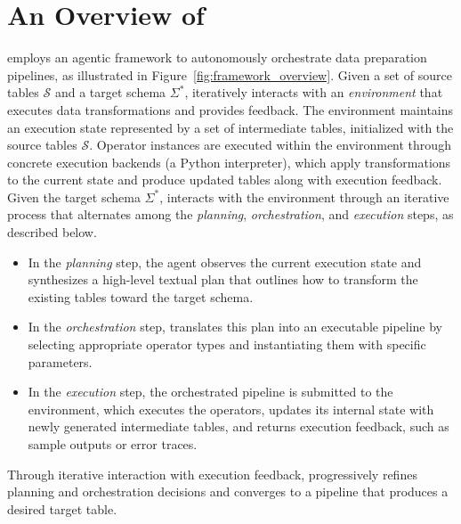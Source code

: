 \section{An Overview of \sys}
\label{sec:overview}


\sys employs an agentic framework to autonomously orchestrate data preparation pipelines, as illustrated in Figure~\ref{fig:framework_overview}. Given a set of source tables $\mathcal{S}$ and a target schema $\Sigma^{\ast}$, \sys iteratively interacts with an \emph{environment} that executes data transformations and provides feedback.
%
The environment maintains an execution state represented by a set of intermediate tables, initialized with the source tables $\mathcal{S}$. Operator instances are executed within the environment through concrete execution backends (\eg a Python interpreter), which apply transformations to the current state and produce updated tables along with execution feedback.
%
Given the target schema $\Sigma^{\ast}$, \sys interacts with the environment through an iterative process that alternates among the \emph{planning}, \emph{orchestration}, and \emph{execution} steps, as described below.
%
\begin{itemize}[leftmargin=*]
    \item In the \emph{planning} step, the agent observes the current execution state and synthesizes a high-level textual plan that outlines how to transform the existing tables toward the target schema. 
    \item In the \emph{orchestration} step, \sys translates this plan into an executable pipeline by selecting appropriate operator types and instantiating them with specific parameters. 
    \item In the \emph{execution} step, the orchestrated pipeline is submitted to the environment, which executes the operators, updates its internal state with newly generated intermediate tables, and returns execution feedback, such as sample outputs or error traces.
\end{itemize}
%
Through iterative interaction with execution feedback, \sys progressively refines planning and orchestration decisions and converges to a pipeline that produces a desired target table.


